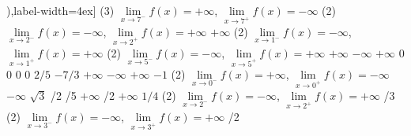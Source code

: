 \begin{mylist}
{\begin{tasks}[counter-format=(tsk[1]),label-width=4ex]
		\startnewitemline
		\task*(3) $\mathop{lim}\limits_{x\to 7^- } f(x)=+\infty$, $\mathop{lim}\limits_{x\to 7^+ } f(x)=-\infty$
		\task*(2)  $\mathop{lim}\limits_{x\to 2^- } f(x)=-\infty$, $\mathop{lim}\limits_{x\to 2^+ } f(x)=+\infty$
		\task $+\infty$\startnewitemline
		\task*(2)  $\mathop{lim}\limits_{x\to 1^- } f(x)=-\infty$, $\mathop{lim}\limits_{x\to 1^+ } f(x)=+\infty$
		\startnewitemline
		\task*(2) $\mathop{lim}\limits_{x\to 5^- } f(x)=-\infty$, $\mathop{lim}\limits_{x\to 5^+ } f(x)=+\infty$
		\task $+\infty$
		\task $-\infty$
		\task $+\infty$
		\task $0$
		\task $0$
		\task $0$
		\task $0$
		\task $2/5$
		\task $-7/3$
		\task $+\infty$
		\task $-\infty$
		\task $+\infty$
		\task $-1$
		\task*(2)  $\mathop{lim}\limits_{x\to 0^- } f(x)=+\infty$, $\mathop{lim}\limits_{x\to 0^+ } f(x)=-\infty$
		\task $-\infty$
		\task $\sqrt{3}$
		/2
		/5
		\task $+\infty$
		/2
		\task $+\infty$
		\task $1/4$\startnewitemline
		\task*(2)  $\mathop{lim}\limits_{x\to 2^- } f(x)=-\infty$, $\mathop{lim}\limits_{x\to 2^+ } f(x)=+\infty$
		/3\startnewitemline
		\task*(2)  $\mathop{lim}\limits_{x\to 3^- } f(x)=-\infty$, $\mathop{lim}\limits_{x\to 3^+ } f(x)=+\infty$
		/2
\end{tasks}}
	

\end{mylist}
